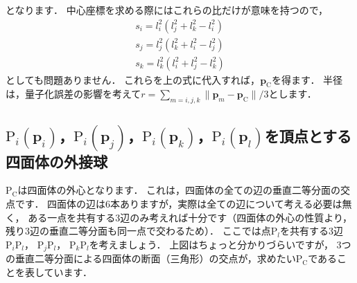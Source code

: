 ﻿\documentclass[a4paper]{jsarticle}
\begin{document}
となります．
中心座標を求める際にはこれらの比だけが意味を持つので，
\begin{align*}
s_{i}=l_{i}^{2}(l_{j}^{2}+l_{k}^{2}-l_{i}^{2})
\\
s_{j}=l_{j}^{2}(l_{k}^{2}+l_{i}^{2}-l_{j}^{2})
\\
s_{k}=l_{k}^{2}(l_{i}^{2}+l_{j}^{2}-l_{k}^{2})
\end{align*}
としても問題ありません．
これらを上の式に代入すれば，$\boldsymbol{p}_{\mathrm{C}}$を得ます．
半径は，量子化誤差の影響を考えて$r=\sum_{m=i,j,k}\|\boldsymbol{p}_{m}-\boldsymbol{p}_{\mathrm{C}}\|/3$とします．

\subsection{$\mathrm{P}_{i}(\boldsymbol{p}_{i})$，$\mathrm{P}_{i}(\boldsymbol{p}_{j})$，$\mathrm{P}_{i}(\boldsymbol{p}_{k})$，$\mathrm{P}_{i}(\boldsymbol{p}_{l})$を頂点とする四面体の外接球}

\begin{figure*}[h]
\centering

\end{figure*}

$\mathrm{P}_{\mathrm{C}}$は四面体の外心となります．
これは，四面体の全ての辺の垂直二等分面の交点です．
四面体の辺は6本ありますが，実際は全ての辺について考える必要は無く，
ある一点を共有する3辺のみ考えれば十分です（四面体の外心の性質より，残り3辺の垂直二等分面も同一点で交わるため）．
ここでは点$\mathrm{P}_{l}$を共有する3辺
$\mathrm{P}_{i}\mathrm{P}_{l}$，
$\mathrm{P}_{j}\mathrm{P}_{l}$，
$\mathrm{P}_{k}\mathrm{P}_{l}$を考えましょう．
上図はちょっと分かりづらいですが，
3つの垂直二等分面による四面体の断面（三角形）の交点が，求めたい$\mathrm{P}_{\mathrm{C}}$であることを表しています．
\end{document}
